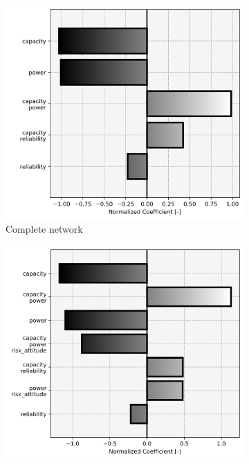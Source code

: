 \begin{figure}[H]
	\centering

\begin{subfigure}[t]{.33\linewidth}
	\centering\captionsetup{width = .8\linewidth}
	\includegraphics[width = \linewidth]{figs/significant_parameters_0.png}
	\caption{Complete network}
\end{subfigure}%
\begin{subfigure}[t]{.33\linewidth}
	\centering\captionsetup{width = .8\linewidth}
	\includegraphics[width = \linewidth]{figs/significant_parameters_1.png}

\end{subfigure}
\end{figure}
